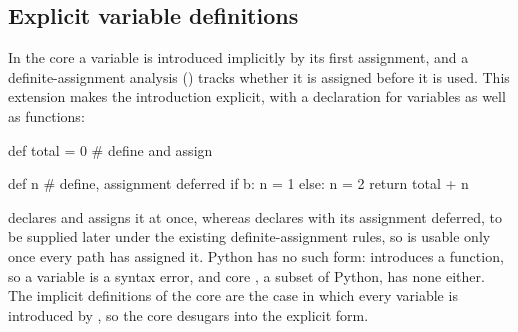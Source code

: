 \subsection{Explicit variable definitions}
\label{sec:ext-explicit-def}

In the core a variable is introduced implicitly by its first assignment, and a definite-assignment analysis
() tracks whether it is assigned before it is used. This extension makes the introduction
explicit, with a  declaration for variables as well as functions:

\begin{python}
def total = 0   # define and assign

def n           # define, assignment deferred
if b:
    n = 1
else:
    n = 2
return total + n
\end{python}

\noindent {} declares  and assigns it at once, whereas 
declares  with its assignment deferred, to be supplied later under the existing definite-assignment
rules, so  is usable only once every path has assigned it. Python has no such form: 
introduces a function, so a variable  is a syntax error, and core \PurePy, a subset of Python, has
none either. The implicit definitions of the core are the case in which every variable is introduced by
, so the core desugars into the explicit form.
